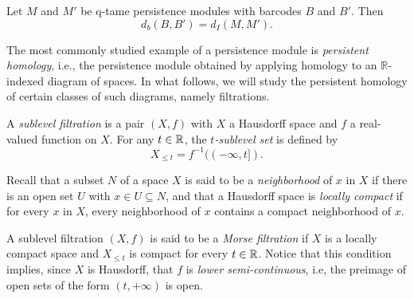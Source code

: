 \begin{thm}[\cite{}]
Let $M$ and $M'$ be q-tame persistence modules with barcodes $B$ and $B'$. Then
\[
d_{b}(B,B')= d_{I}(M,M').
\]
\end{thm}

The most commonly studied example of a persistence module is \emph{persistent homology}, i.e., the persistence module obtained by applying homology to an $\mathbb{R}$-indexed diagram of spaces. In what follows, we will study the persistent homology of certain classes of such diagrams, namely filtrations.

A \textit{sublevel filtration} is a pair $(X, f)$ with $X$ a Hausdorff space and $f$ a real-valued function on $X$.
For any $t \in \mathbb{R}$, the \textit{$t$-sublevel set} is defined by 
\begin{equation*}
X_{\leq t} = f^{-1}((-\infty, t]).
\end{equation*}

Recall that a subset $N$ of a space $X$ is said to be a \textit{neighborhood} of $x$ in $X$ if there is an open set $U$ with $x \in U \subseteq N$, and that a Hausdorff space is \textit{locally compact} if for every $x$ in $X$, every neighborhood of $x$ contains a compact neighborhood of $x$.

A sublevel filtration $(X, f)$ is said to be a \textit{Morse filtration} if $X$ is a locally compact space and $X_{\leq t}$ is compact for every $t \in \mathbb{R}$.
Notice that this condition implies, since $X$ is Hausdorff, that $f$ is \textit{lower semi-continuous}, i.e, the preimage of open sets of the form $(t, +\infty)$ is open.
